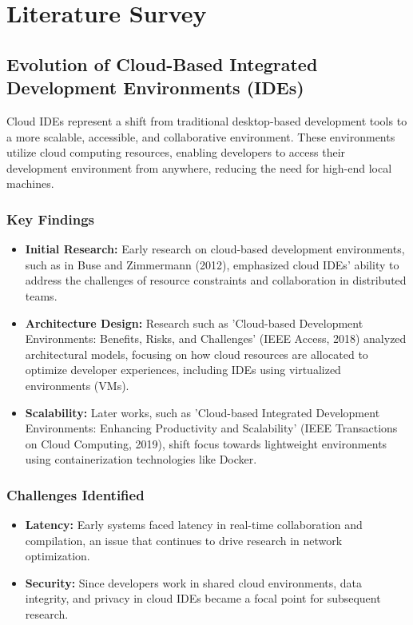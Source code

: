 \documentclass[12pt,a4paper,final]{report}
\begin{document}
\chapter{Literature Survey}
\newpage
\section{Evolution of Cloud-Based Integrated Development Environments (IDEs)}

Cloud IDEs represent a shift from traditional desktop-based development tools to a more scalable, accessible, and collaborative environment. These environments utilize cloud computing resources, enabling developers to access their development environment from anywhere, reducing the need for high-end local machines.

\subsection{Key Findings}
\begin{itemize}
    \item \textbf{Initial Research:} Early research on cloud-based development environments, such as in Buse and Zimmermann (2012), emphasized cloud IDEs' ability to address the challenges of resource constraints and collaboration in distributed teams.
    \item \textbf{Architecture Design:} Research such as 'Cloud-based Development Environments: Benefits, Risks, and Challenges' (IEEE Access, 2018) analyzed architectural models, focusing on how cloud resources are allocated to optimize developer experiences, including IDEs using virtualized environments (VMs).
    \item \textbf{Scalability:} Later works, such as 'Cloud-based Integrated Development Environments: Enhancing Productivity and Scalability' (IEEE Transactions on Cloud Computing, 2019), shift focus towards lightweight environments using containerization technologies like Docker.
\end{itemize}

\subsection{Challenges Identified}
\begin{itemize}
    \item \textbf{Latency:} Early systems faced latency in real-time collaboration and compilation, an issue that continues to drive research in network optimization.
    \item \textbf{Security:} Since developers work in shared cloud environments, data integrity, and privacy in cloud IDEs became a focal point for subsequent research.
\end{itemize}
\end{document}
